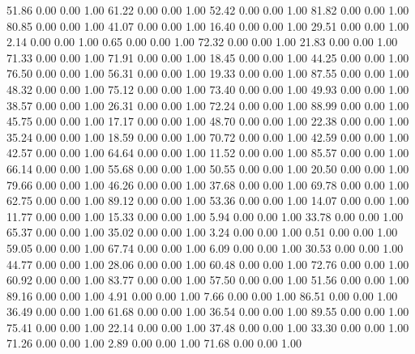    51.86   0.00   0.00   1.00
   61.22   0.00   0.00   1.00
   52.42   0.00   0.00   1.00
   81.82   0.00   0.00   1.00
   80.85   0.00   0.00   1.00
   41.07   0.00   0.00   1.00
   16.40   0.00   0.00   1.00
   29.51   0.00   0.00   1.00
    2.14   0.00   0.00   1.00
    0.65   0.00   0.00   1.00
   72.32   0.00   0.00   1.00
   21.83   0.00   0.00   1.00
   71.33   0.00   0.00   1.00
   71.91   0.00   0.00   1.00
   18.45   0.00   0.00   1.00
   44.25   0.00   0.00   1.00
   76.50   0.00   0.00   1.00
   56.31   0.00   0.00   1.00
   19.33   0.00   0.00   1.00
   87.55   0.00   0.00   1.00
   48.32   0.00   0.00   1.00
   75.12   0.00   0.00   1.00
   73.40   0.00   0.00   1.00
   49.93   0.00   0.00   1.00
   38.57   0.00   0.00   1.00
   26.31   0.00   0.00   1.00
   72.24   0.00   0.00   1.00
   88.99   0.00   0.00   1.00
   45.75   0.00   0.00   1.00
   17.17   0.00   0.00   1.00
   48.70   0.00   0.00   1.00
   22.38   0.00   0.00   1.00
   35.24   0.00   0.00   1.00
   18.59   0.00   0.00   1.00
   70.72   0.00   0.00   1.00
   42.59   0.00   0.00   1.00
   42.57   0.00   0.00   1.00
   64.64   0.00   0.00   1.00
   11.52   0.00   0.00   1.00
   85.57   0.00   0.00   1.00
   66.14   0.00   0.00   1.00
   55.68   0.00   0.00   1.00
   50.55   0.00   0.00   1.00
   20.50   0.00   0.00   1.00
   79.66   0.00   0.00   1.00
   46.26   0.00   0.00   1.00
   37.68   0.00   0.00   1.00
   69.78   0.00   0.00   1.00
   62.75   0.00   0.00   1.00
   89.12   0.00   0.00   1.00
   53.36   0.00   0.00   1.00
   14.07   0.00   0.00   1.00
   11.77   0.00   0.00   1.00
   15.33   0.00   0.00   1.00
    5.94   0.00   0.00   1.00
   33.78   0.00   0.00   1.00
   65.37   0.00   0.00   1.00
   35.02   0.00   0.00   1.00
    3.24   0.00   0.00   1.00
    0.51   0.00   0.00   1.00
   59.05   0.00   0.00   1.00
   67.74   0.00   0.00   1.00
    6.09   0.00   0.00   1.00
   30.53   0.00   0.00   1.00
   44.77   0.00   0.00   1.00
   28.06   0.00   0.00   1.00
   60.48   0.00   0.00   1.00
   72.76   0.00   0.00   1.00
   60.92   0.00   0.00   1.00
   83.77   0.00   0.00   1.00
   57.50   0.00   0.00   1.00
   51.56   0.00   0.00   1.00
   89.16   0.00   0.00   1.00
    4.91   0.00   0.00   1.00
    7.66   0.00   0.00   1.00
   86.51   0.00   0.00   1.00
   36.49   0.00   0.00   1.00
   61.68   0.00   0.00   1.00
   36.54   0.00   0.00   1.00
   89.55   0.00   0.00   1.00
   75.41   0.00   0.00   1.00
   22.14   0.00   0.00   1.00
   37.48   0.00   0.00   1.00
   33.30   0.00   0.00   1.00
   71.26   0.00   0.00   1.00
    2.89   0.00   0.00   1.00
   71.68   0.00   0.00   1.00
